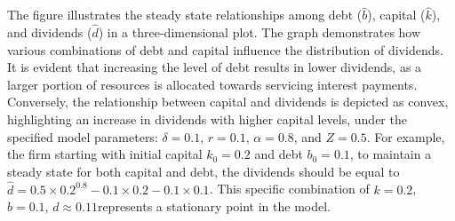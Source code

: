 \documentclass[12pt]{article}
\begin{document}
The figure illustrates the steady state relationships among debt (\(\widehat{b}\)), capital (\(\widehat{k}\)), and
dividends  (\(\widehat{d}\)) in a three-dimensional plot. The graph demonstrates how various combinations of debt and
capital influence the distribution of dividends. It is evident that increasing the level of debt results in lower
dividends, as a larger portion of resources is allocated towards servicing interest payments. Conversely, the
relationship between capital and dividends is depicted as convex, highlighting an increase in dividends with higher
capital levels, under the specified model parameters: \(\delta = 0.1\), \(r = 0.1\), \(\alpha = 0.8\), and \(Z = 0.5\).
For example, the firm starting with initial capital \(k_0 = 0.2\) and debt \(b_0 = 0.1\), to maintain a steady state for both
capital and  debt, the dividends should be equal to \(\widehat{d} = 0.5 \times 0.2^{0.8} - 0.1 \times 0.2 - 0.1
\times 0.1\). This specific combination of \(k= 0.2\), \(b = 0.1\), \(d \approx 0.11 \)represents a stationary point in the model.
\vspace{1cm}
\end{document}

